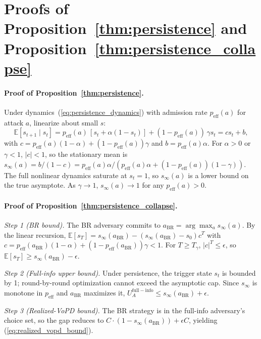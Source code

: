 \documentclass{article}
\begin{document}
\section{Proofs of Proposition~\ref{thm:persistence} and Proposition~\ref{thm:persistence_collapse}}
\label{app:persistence}

\paragraph{Proof of Proposition~\ref{thm:persistence}.}
Under dynamics~(\ref{eq:persistence_dynamics}) with admission rate $p_{\mathrm{eff}}(a)$ for attack $a$, linearize about small $s$:
\[
\mathbb{E}[s_{t+1} \mid s_t] = p_{\mathrm{eff}}(a)\,[s_t + \alpha(1-s_t)] + (1-p_{\mathrm{eff}}(a))\,\gamma s_t = c s_t + b,
\]
with $c = p_{\mathrm{eff}}(a)(1-\alpha) + (1-p_{\mathrm{eff}}(a))\gamma$ and $b = p_{\mathrm{eff}}(a)\alpha$. For $\alpha > 0$ or $\gamma < 1$, $|c| < 1$, so the stationary mean is $s_\infty(a) = b/(1-c) = p_{\mathrm{eff}}(a)\alpha / (p_{\mathrm{eff}}(a)\alpha + (1-p_{\mathrm{eff}}(a))(1-\gamma))$. The full nonlinear dynamics saturate at $s_t = 1$, so $s_\infty(a)$ is a lower bound on the true asymptote. As $\gamma \to 1$, $s_\infty(a) \to 1$ for any $p_{\mathrm{eff}}(a) > 0$.

\paragraph{Proof of Proposition~\ref{thm:persistence_collapse}.}
\emph{Step 1 (BR bound).} The BR adversary commits to $a_{\mathrm{BR}} = \arg\max_a s_\infty(a)$. By the linear recursion, $\mathbb{E}[s_T] = s_\infty(a_{\mathrm{BR}}) - (s_\infty(a_{\mathrm{BR}}) - s_0) c^T$ with $c = p_{\mathrm{eff}}(a_{\mathrm{BR}})(1-\alpha) + (1-p_{\mathrm{eff}}(a_{\mathrm{BR}}))\gamma < 1$. For $T \geq T_\gamma$, $|c|^T \leq \epsilon$, so $\mathbb{E}[s_T] \geq s_\infty(a_{\mathrm{BR}}) - \epsilon$.

\emph{Step 2 (Full-info upper bound).} Under persistence, the trigger state $s_t$ is bounded by 1; round-by-round optimization cannot exceed the asymptotic cap. Since $s_\infty$ is monotone in $p_{\mathrm{eff}}$ and $a_{\mathrm{BR}}$ maximizes it, $U_A^{\mathrm{full-info}} \leq s_\infty(a_{\mathrm{BR}}) + \epsilon$.

\emph{Step 3 (Realized-VoPD bound).} The BR strategy is in the full-info adversary's choice set, so the gap reduces to $C \cdot (1 - s_\infty(a_{\mathrm{BR}})) + \epsilon C$, yielding (\ref{eq:realized_vopd_bound}).
\end{document}
